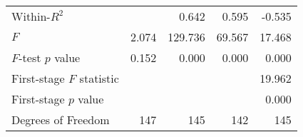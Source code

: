 \begin{tabular}{lrrrr}
Within-$R^2$              &          &    0.642 &     0.595 &                         -0.535 \\ 
$F$                       &    2.074 &  129.736 &    69.567 &                         17.468 \\ 
$F$-test $p$ value        &    0.152 &    0.000 &     0.000 &                          0.000 \\ 
First-stage $F$ statistic &          &          &           &                         19.962 \\ 
First-stage $p$ value     &          &          &           &                          0.000 \\ 
Degrees of Freedom        &      147 &      145 &       142 &                            145 \\ 
\bottomrule
\end{tabular}
